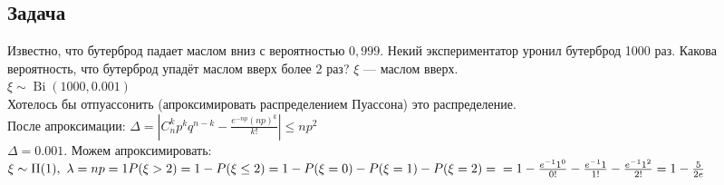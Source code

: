 \documentclass[12pt, a4paper]{article}
\begin{document}
    \subsection*{Задача}
    Известно, что бутерброд падает маслом вниз с вероятностью $0,999$. Некий экспериментатор уронил бутерброд 1000 раз. Какова вероятность, что бутерброд упадёт маслом вверх более 2 раз?
    $\xi$ --- маслом вверх.\\
    $\xi \sim \operatorname{Bi}(1000, 0.001)$\\
    Хотелось бы отпуассонить (апроксимировать распределением Пуассона) это распределение.\\
    После апроксимации: $\Delta = \left|C_n^k p^k q^{n - k} - \frac{e^{-np}(np)^k}{k!}\right|\leq np^2$\\
    $\Delta = 0.001$. Можем апроксимировать: $\xi \sim \Pi(1),\ \lambda = np = 1\\
    P(\xi > 2) = 1 - P(\xi\leq 2) = 1 - P(\xi = 0) - P(\xi = 1) - P(\xi = 2) =\\
    = 1 - \frac{e^{-1}1^0}{0!} - \frac{e^{-1} 1}{1!} - \frac{e^{-1}1^2}{2!} = 1 - \frac{5}{2e}$
\end{document}
